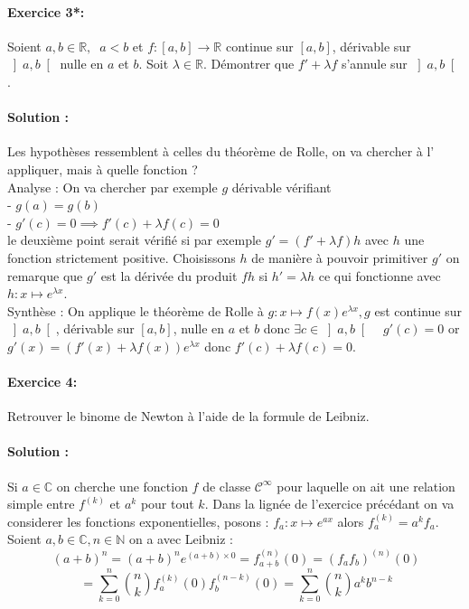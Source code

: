 \documentclass[letterpaper,10pt]{article}
\begin{document}
\paragraph{Exercice 3*:}
Soient $a,b\in \mathbb{R},\;\; a<b$ et $f:\left[a,b\right] \to \mathbb{R}$ continue 
sur $\left[a,b\right]$, dérivable sur $\left]a,b\right[$ nulle en $a$ et $b$.
 Soit $\lambda \in \mathbb{R}$.
Démontrer que $f' + \lambda f$ s'annule sur $\left]a,b\right[$. 

\paragraph{Solution :}

Les hypothèses ressemblent à celles du théorème de Rolle, on va chercher à l' appliquer, mais à quelle fonction ? \\
Analyse : On va chercher par exemple $g$ dérivable vérifiant \\
- $g(a) = g(b)$\\
- $g'(c) = 0 \implies f'(c) + \lambda
f(c) = 0$\\
le deuxième point serait vérifié si par exemple $g'= (f'+\lambda f)h$ avec $h$ une fonction strictement positive. Choisissons $h$ de manière à pouvoir primitiver $g'$ on remarque que $g'$ est la dérivée du produit $fh$ si $h' =\lambda h$ ce qui fonctionne avec $h : x\mapsto e^{\lambda x}$.\\
Synthèse : On applique le théorème de Rolle à $g:x\mapsto f(x)e^{\lambda x}, g $ est continue sur $\left]a,b\right[$, dérivable sur $\left[a,b\right]$, nulle en $a$ et $b$ donc $ \exists c \in \left]a,b\right[ \quad g'(c) = 0 $ or $g'(x) = (f'(x) + \lambda f(x))e^{\lambda x}$ donc $f'(c) + \lambda f(c) = 0$. 
\paragraph{Exercice 4:}
    Retrouver le binome de Newton à l'aide de la formule de Leibniz.
    \paragraph{Solution :}
    Si $a\in \mathbb{C}$ on cherche une fonction $f$ de classe $\mathcal{C}^{\infty}$ pour laquelle on ait une relation simple entre $f^{(k)}$ et $a^k$ pour tout $k$. Dans la lignée de l'exercice précédant on va considerer les fonctions exponentielles, posons : $f_a : x \mapsto e^{ax}$ alors $f_a^{(k)} = a^kf_a$.
    Soient $a,b \in \mathbb{C},n\in \mathbb{N}$ on a avec Leibniz : \[\
    (a+b)^n = (a+b)^ne^{(a+b)×0} =f_{a+b}^{(n)}(0) = (f_af_b)^{(n)}(0)\] \[\ = \sum_{k=0}^n\binom{n}{k}f_a^{(k)}(0)f_b^{(n-k)}(0) = \sum_{k=0}^n \binom{n}{k}a^kb^{n-k}
    \]
\end{document}

